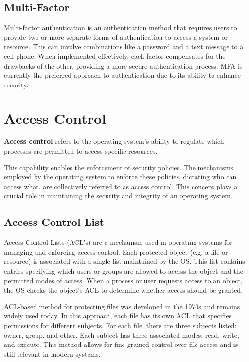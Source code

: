 \documentclass{report}
\newcommand{\definitionBegin}[1]{\begin{tcolorbox}[title={Definition: #1}]}
\newcommand{\definitionEnd}{\end{tcolorbox}}
\newcommand{\exampleBegin}[1]{\begin{tcolorbox}[colback=blue!5!white,colframe=black!75!blue,title={Example:
      #1}]}
\newcommand{\exampleEnd}{\end{tcolorbox}}
\begin{document}
\subsection{Multi-Factor}
Multi-factor authentication is an authentication method that requires users to provide two or
more separate forms of authentication to access a system or resource. This can involve combinations
like a password and a text message to a cell phone. When implemented effectively, each factor
compensates for the drawbacks of the other, providing a more secure authentication process. MFA is
currently the preferred approach to authentication due to its ability to enhance security. 


\section{Access Control}
\definitionBegin{Access Control}
\textbf{Access control} refers to the operating system's ability to regulate which processes are permitted to
access specific resources.
\definitionEnd

This capability enables the enforcement of security policies. The mechanisms employed by the
operating system to enforce these policies, dictating who can access what, are collectively referred
to as access control. This concept plays a crucial role in maintaining the security and integrity of
an operating system.


\subsection{Access Control List}
\label{subsec:ACL}
Access Control Lists (ACL's) are a mechanism used in operating systems for managing and enforcing
access control. Each protected object (e.g. a file or resource) is associated with a single list
maintained by the OS. This list contains entries specifying which users or groups are allowed to
access the object and the permitted modes of access. When a process or user requests access to an
object, the OS checks the object's ACL to determine whether access should be granted. 

\exampleBegin{ACL's in Unix}
ACL-based method for protecting files was developed in the 1970s and remains widely used today. In
this approach, each file has its own ACL that specifies permissions for different subjects. For each
file, there are three subjects listed: owner, group, and other. Each subject has three associated
modes: read, write, and execute. This method allows for fine-grained control over file access and is
still relevant in modern systems.
\exampleEnd
\end{document}
